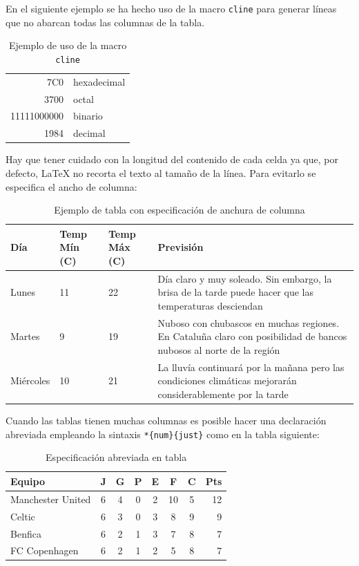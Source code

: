 \documentclass[11pt,a4paper]{article}
\begin{document}
En el siguiente ejemplo se ha hecho uso de la macro \texttt{cline} para generar líneas que no abarcan todas las columnas de la tabla.

\begin{table}[htb]%
	\centering
	\caption{Ejemplo de uso de la macro \texttt{cline}}
	\label{tab:cline}
	\begin{tabular}[t]{|r|l|}
	\hline
	7C0 & hexadecimal \\[1cm] %
	3700 & octal \\ \cline{2-2}
	11111000000 & binario \\
	\hline \hline
	1984 & decimal \\
	\hline
	\end{tabular}
\end{table}

Hay que tener cuidado con la longitud del contenido de cada celda ya que, por defecto, \LaTeX{} no recorta el texto al tamaño de la línea. Para evitarlo se especifica el ancho de columna:

\begin{table}[htb]%
	\centering
	\caption{Ejemplo de tabla con especificación de anchura de columna}
	\label{tab:anchura}
	\begin{tabular}{ | l | l | l | p{5cm} |}
	\hline
	Día & Temp Mín (\textdegree C) & Temp Máx (\textdegree C) & Previsión \\ \hline
	Lunes & 11 & 22 & Día claro y muy soleado. Sin embargo, la brisa de la tarde puede hacer que las temperaturas desciendan \\ \hline
	Martes & 9 & 19 & Nuboso con chubascos en muchas regiones. En Cataluña claro con posibilidad de bancos nubosos al norte de la región \\ \hline
	Miércoles & 10 & 21 & La lluvía continuará por la mañana pero las condiciones climáticas mejorarán considerablemente por la tarde\\
	\hline
	\end{tabular}
\end{table}

Cuando las tablas tienen muchas columnas es posible hacer una declaración abreviada empleando la sintaxis \texttt{*\{num\}\{just\}} como en la tabla siguiente:

\begin{table}[htb]%
	\centering
	\caption{Especificación abreviada en tabla}
	\label{tab:anchura}
	\begin{tabular}{l*{6}{c}|r}
	Equipo            & J & G & P & E & F  & C & Pts \\
	\hline
	Manchester United & 6 & 4 & 0 & 2 & 10 & 5 & 12  \\
	Celtic            & 6 & 3 & 0 & 3 &  8 & 9 &  9  \\
	Benfica           & 6 & 2 & 1 & 3 &  7 & 8 &  7  \\
	FC Copenhagen     & 6 & 2 & 1 & 2 &  5 & 8 &  7  \\
	\end{tabular}
\end{table}
\end{document}
